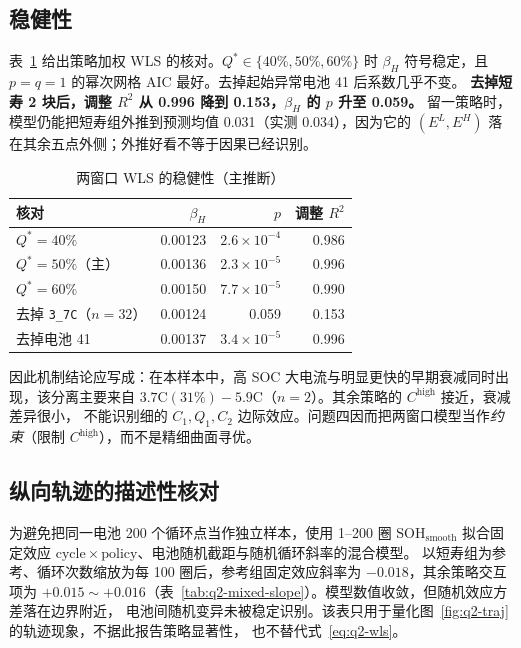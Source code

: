 \subsection{稳健性}

表~\ref{tab:q2-robust} 给出策略加权 WLS 的核对。\(Q^\ast\in\{40\%,50\%,60\%\}\) 时 \(\beta_H\)
符号稳定，且 \(p=q=1\) 的幂次网格 AIC 最好。去掉起始异常电池 41 后系数几乎不变。
\textbf{去掉短寿 2 块后，调整 \(R^2\) 从 0.996 降到 0.153，\(\beta_H\) 的 \(p\) 升至 0.059。}
留一策略时，模型仍能把短寿组外推到预测均值 0.031（实测 0.034），因为它的 \((E^{L},E^{H})\)
落在其余五点外侧；外推好看不等于因果已经识别。

\begin{table}[htbp]
\centering
\caption{两窗口 WLS 的稳健性（主推断）}
\label{tab:q2-robust}
\small
\begin{tabular}{lrrr}
\toprule
核对 & \(\beta_H\) & \(p\) & 调整 \(R^2\) \\
\midrule
\(Q^\ast=40\%\) & 0.00123 & \(2.6\times 10^{-4}\) & 0.986 \\
\(Q^\ast=50\%\)（主） & 0.00136 & \(2.3\times 10^{-5}\) & 0.996 \\
\(Q^\ast=60\%\) & 0.00150 & \(7.7\times 10^{-5}\) & 0.990 \\
去掉 \texttt{3\_7C}（\(n=32\)） & 0.00124 & 0.059 & 0.153 \\
去掉电池 41 & 0.00137 & \(3.4\times 10^{-5}\) & 0.996 \\
\bottomrule
\end{tabular}
\end{table}

因此机制结论应写成：在本样本中，高 SOC 大电流与明显更快的早期衰减同时出现，该分离主要来自
\(3.7\mathrm{C}(31\%)-5.9\mathrm{C}\)（\(n=2\)）。其余策略的 \(C^{\mathrm{high}}\) 接近，衰减差异很小，
不能识别细的 \(C_1,Q_1,C_2\) 边际效应。问题四因而把两窗口模型当作\emph{约束}（限制
\(C^{\mathrm{high}}\)），而不是精细曲面寻优。

\subsection{纵向轨迹的描述性核对}

为避免把同一电池 200 个循环点当作独立样本，使用 1--200 圈 \(\mathrm{SOH}_{\mathrm{smooth}}\)
拟合固定效应 \(\mathrm{cycle}\times\mathrm{policy}\)、电池随机截距与随机循环斜率的混合模型。
以短寿组为参考、循环次数缩放为每 100 圈后，参考组固定效应斜率为 \(-0.018\)，其余策略交互项为
\(+0.015\sim +0.016\)（表~\ref{tab:q2-mixed-slope}）。模型数值收敛，但随机效应方差落在边界附近，
电池间随机变异未被稳定识别。该表只用于量化图~\ref{fig:q2-traj} 的轨迹现象，不据此报告策略显著性，
也不替代式~\eqref{eq:q2-wls}。

